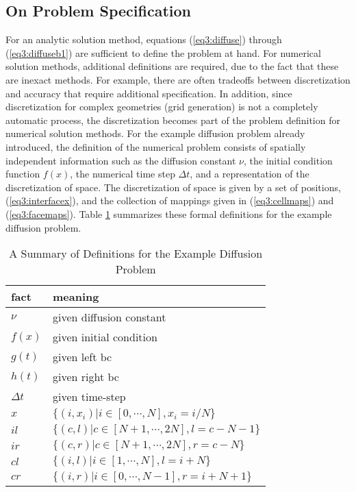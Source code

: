 \documentclass[10pt,epsf]{book}
\begin{document}
\subsection{On Problem Specification}

For an analytic solution method, equations (\ref{eq3:diffuse}) through
(\ref{eq3:diffuseb1}) are sufficient to define the problem at hand.
For numerical solution methods, additional definitions are required,
due to the fact that these are inexact methods.  For example, there
are often tradeoffs between discretization and accuracy that require
additional specification.  In addition, since discretization for
complex geometries (grid generation) is not a completely automatic
process, the discretization becomes part of the problem definition for
numerical solution methods.  For the example diffusion problem already
introduced, the definition of the numerical problem consists of
spatially independent information such as the diffusion constant
$\nu$, the initial condition function $f(x)$, the numerical time step
$\Delta t$, and a representation of the discretization of space.  The
discretization of space is given by a set of positions,
(\ref{eq3:interfacex}), and the collection of mappings given in
(\ref{eq3:cellmaps}) and (\ref{eq3:facemaps}).  Table
\ref{table3:facts} summarizes these formal definitions for the example
diffusion problem.


\begin{table}[htbp]
\caption{ A Summary of Definitions for the Example Diffusion
  Problem}
\label{table3:facts}
\begin{center}
  \begin{tabular}{|l|l|}
    \hline
    fact      & meaning \\
    \hline
    $\nu$     & given diffusion constant  \\
    $f(x)$     & given initial condition  \\
    $g(t)$     & given left bc \\
    $h(t)$     & given right bc  \\
    $\Delta t$& given time-step  \\
    $x$       & $\lbrace (i,x_i) | i \in [0, \cdots, N], x_i = i/N    \rbrace$\\
    $il$      & $\lbrace (c,l)   | c \in [N+1, \cdots, 2N], l = c-N-1 \rbrace$\\
    $ir$      & $\lbrace (c,r)   | c \in [N+1, \cdots, 2N], r = c-N   \rbrace$\\
    $cl$      & $\lbrace (i,l)   | i \in [1, \cdots, N], l = i+N      \rbrace$\\
    $cr$      & $\lbrace (i,r)   | i \in [0, \cdots, N-1], r = i+N+1  \rbrace$\\
    \hline
  \end{tabular}
\end{center}
\end{table}
\end{document}
